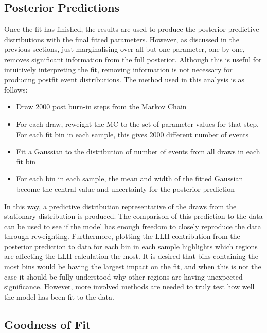 \subsection{Posterior Predictions}\label{sec:postpred}

Once the fit has finished, the results are used to produce the posterior predictive distributions with the final fitted parameters. However, as discussed in the previous sections, just marginalising over all but one parameter, one by one, removes significant information from the full posterior. Although this is useful for intuitively interpreting the fit, removing information is not necessary for producing postfit event distributions. The method used in this analysis is as follows:

\begin{itemize}
   \item Draw 2000 post burn-in steps from the Markov Chain
   \item For each draw, reweight the MC to the set of parameter values for that step. For each fit bin in each sample, this gives 2000 different number of events
   \item Fit a Gaussian to the distribution of number of events from all draws in each fit bin 
   \item For each bin in each sample, the mean and width of the fitted Gaussian become the central value and uncertainty for the posterior prediction
   \end{itemize}
   
In this way, a predictive distribution representative of the draws from the stationary distribution is produced. The comparison of this prediction to the data can be used to see if the model has enough freedom to closely reproduce the data through reweighting. Furthermore, plotting the LLH contribution from the posterior prediction to data for each bin in each sample highlights which regions are affecting the LLH calculation the most. It is desired that bins containing the most bins would be having the largest impact on the fit, and when this is not the case it should be fully understood why other regions are having unexpected significance. However, more involved methods are needed to truly test how well the model has been fit to the data.

\subsection{Goodness of Fit}\label{sec:pval}

